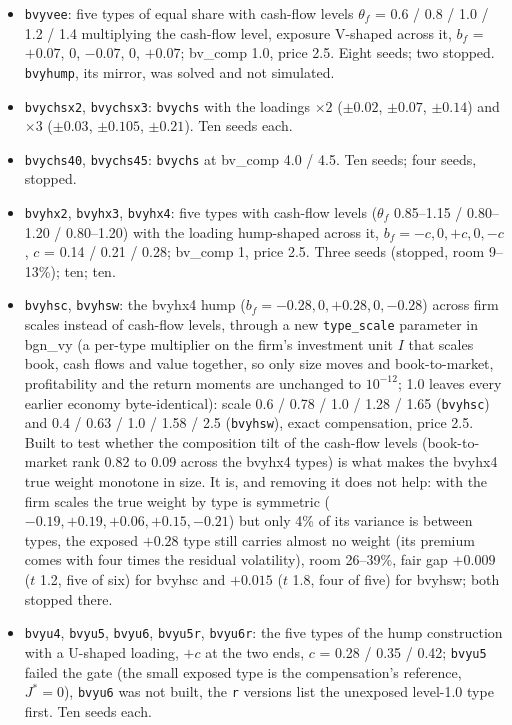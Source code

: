 \documentclass[11pt]{article}
\begin{document}
\begin{itemize}
\item \texttt{bvyvee}: five types of equal share with cash-flow levels $\theta_f$ = 0.6 / 0.8 / 1.0 / 1.2 / 1.4 multiplying the cash-flow level, exposure V-shaped across it, $b_f$ = $+0.07$, 0, $-0.07$, 0, $+0.07$; bv\_comp 1.0, price 2.5. Eight seeds; two stopped. \texttt{bvyhump}, its mirror, was solved and not simulated.
\item \texttt{bvychsx2}, \texttt{bvychsx3}: \texttt{bvychs} with the loadings $\times2$ ($\pm0.02$, $\pm0.07$, $\pm0.14$) and $\times3$ ($\pm0.03$, $\pm0.105$, $\pm0.21$). Ten seeds each.
\item \texttt{bvychs40}, \texttt{bvychs45}: \texttt{bvychs} at bv\_comp 4.0 / 4.5. Ten seeds; four seeds, stopped.
\item \texttt{bvyhx2}, \texttt{bvyhx3}, \texttt{bvyhx4}: five types with cash-flow levels ($\theta_f$ 0.85--1.15 / 0.80--1.20 / 0.80--1.20) with the loading hump-shaped across it, $b_f=-c,0,+c,0,-c$, $c$ = 0.14 / 0.21 / 0.28; bv\_comp 1, price 2.5. Three seeds (stopped, room 9--13\%); ten; ten.
\item \texttt{bvyhsc}, \texttt{bvyhsw}: the bvyhx4 hump ($b_f = -0.28, 0, +0.28, 0, -0.28$) across firm scales instead of cash-flow levels, through a new \texttt{type\_scale} parameter in bgn\_vy (a per-type multiplier on the firm's investment unit $I$ that scales book, cash flows and value together, so only size moves and book-to-market, profitability and the return moments are unchanged to $10^{-12}$; 1.0 leaves every earlier economy byte-identical): scale 0.6 / 0.78 / 1.0 / 1.28 / 1.65 (\texttt{bvyhsc}) and 0.4 / 0.63 / 1.0 / 1.58 / 2.5 (\texttt{bvyhsw}), exact compensation, price 2.5. Built to test whether the composition tilt of the cash-flow levels (book-to-market rank 0.82 to 0.09 across the bvyhx4 types) is what makes the bvyhx4 true weight monotone in size. It is, and removing it does not help: with the firm scales the true weight by type is symmetric ($-0.19, +0.19, +0.06, +0.15, -0.21$) but only 4\% of its variance is between types, the exposed $+0.28$ type still carries almost no weight (its premium comes with four times the residual volatility), room 26--39\%, fair gap $+0.009$ ($t$ 1.2, five of six) for bvyhsc and $+0.015$ ($t$ 1.8, four of five) for bvyhsw; both stopped there.
\item \texttt{bvyu4}, \texttt{bvyu5}, \texttt{bvyu6}, \texttt{bvyu5r}, \texttt{bvyu6r}: the five types of the hump construction with a U-shaped loading, $+c$ at the two ends, $c$ = 0.28 / 0.35 / 0.42; \texttt{bvyu5} failed the gate (the small exposed type is the compensation's reference, $J^* = 0$), \texttt{bvyu6} was not built, the \texttt{r} versions list the unexposed level-1.0 type first. Ten seeds each.

\end{itemize}
\end{document}
